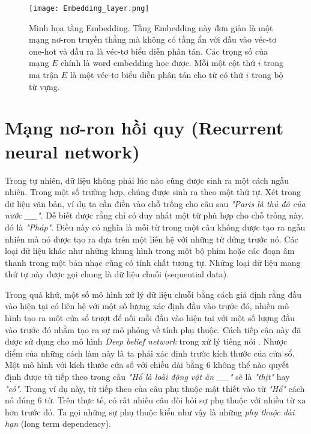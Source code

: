 \begin{figure}
	\centering
	\texttt{[image: Embedding\_layer.png]}
	\caption[Minh họa tầng Embedding.]{Minh họa tầng Embedding. Tầng Embedding này đơn giản là một mạng nơ-ron truyền thẳng mà không có tầng ẩn với đầu vào véc-tơ one-hot và đầu ra là véc-tơ biểu diễn phân tán. Các trọng số của mạng $E$ chính là word embedding học được. Mỗi một cột thứ $i$ trong ma trận $E$ là một véc-tơ biểu diễn phân tán cho từ có thứ $i$ trong bộ từ vựng.}
	\label{fig_embedding_layer}
\end{figure}

\section{Mạng nơ-ron hồi quy (Recurrent neural network)} \label{rnnsection}

Trong tự nhiên, dữ liệu không phải lúc nào cũng được sinh ra một cách ngẫu nhiên. Trong một số trường hợp, chúng được sinh ra theo một thứ tự. Xét trong dữ liệu văn bản, ví dụ ta cần điền vào chỗ trống cho câu sau \textit{"Paris là thủ đô của nước \_\_"}. Dễ biết được rằng chỉ có duy nhất một từ phù hợp cho chỗ trống này, đó là \textit{"Pháp"}. Điều này có nghĩa là mỗi từ trong một câu không được tạo ra ngẫu nhiên mà nó được tạo ra dựa trên một liên hệ với những từ đứng trước nó. Các loại dữ liệu khác như những khung hình trong một bộ phim hoặc các đoạn âm thanh trong một bản nhạc cũng có tính chất tương tự. Những loại dữ liệu mang thứ tự này được gọi chung là dữ liệu chuỗi (sequential data).

Trong quá khứ, một số mô hình xử lý dữ liệu chuỗi bằng cách giả định rằng đầu vào hiện tại có liên hệ với một số lượng xác định đầu vào trước đó, nhiều mô hình tạo ra một cửa sổ trượt để nối mỗi đầu vào hiện tại với một số lượng đầu vào trước đó nhằm tạo ra sự mô phỏng về tính phụ thuộc. Cách tiếp cận này đã được sử dụng cho mô hình \textit{Deep belief network} trong xử lý tiếng nói \cite{massetal2012}. Nhược điểm của những cách làm này là ta phải xác định trước kích thước của cửa sổ. Một mô hình với kích thước cửa sổ với chiều dài bằng 6 không thể nào quyết định được từ tiếp theo trong câu \textit{"Hổ là loài động vật ăn \_\_"} sẽ là \textit{"thịt"} hay \textit{"cỏ"}. Trong ví dụ này, từ tiếp theo của câu phụ thuộc mật thiết vào từ \textit{"Hổ"} cách nó đúng 6 từ. Trên thực tế, có rất nhiều câu đòi hỏi sự phụ thuộc với nhiều từ xa hơn trước đó. Ta gọi những sự phụ thuộc kiểu như vậy là những \textit{phụ thuộc dài hạn} (long term dependency). 

